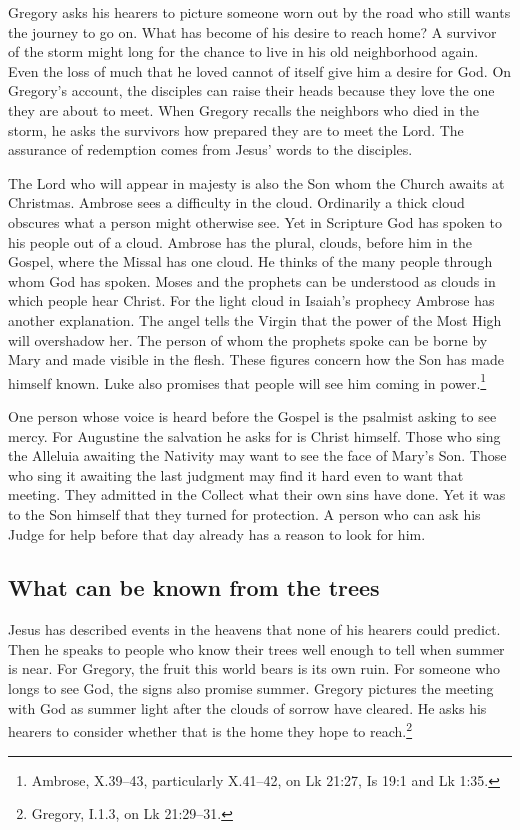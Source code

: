 Gregory asks his hearers to picture someone worn out by the road who still wants the journey to go on. What has become of his desire to reach home? A survivor of the storm might long for the chance to live in his old neighborhood again. Even the loss of much that he loved cannot of itself give him a desire for God. On Gregory's account, the disciples can raise their heads because they love the one they are about to meet. When Gregory recalls the neighbors who died in the storm, he asks the survivors how prepared they are to meet the Lord. The assurance of redemption comes from Jesus’ words to the disciples.

The Lord who will appear in majesty is also the Son whom the Church awaits at Christmas. Ambrose sees a difficulty in the cloud. Ordinarily a thick cloud obscures what a person might otherwise see. Yet in Scripture God has spoken to his people out of a cloud. Ambrose has the plural, clouds, before him in the Gospel, where the Missal has one cloud. He thinks of the many people through whom God has spoken. Moses and the prophets can be understood as clouds in which people hear Christ. For the light cloud in Isaiah's prophecy Ambrose has another explanation. The angel tells the Virgin that the power of the Most High will overshadow her. The person of whom the prophets spoke can be borne by Mary and made visible in the flesh. These figures concern how the Son has made himself known. Luke also promises that people will see him coming in power.\footnote{Ambrose,  X.39--43, particularly X.41--42, on Lk 21:27, Is 19:1 and Lk 1:35.}

One person whose voice is heard before the Gospel is the psalmist asking to see mercy. For Augustine the salvation he asks for is Christ himself. Those who sing the Alleluia awaiting the Nativity may want to see the face of Mary's Son. Those who sing it awaiting the last judgment may find it hard even to want that meeting. They admitted in the Collect what their own sins have done. Yet it was to the Son himself that they turned for protection. A person who can ask his Judge for help before that day already has a reason to look for him.

\subsection{What can be known from the trees}

Jesus has described events in the heavens that none of his hearers could predict. Then he speaks to people who know their trees well enough to tell when summer is near. For Gregory, the fruit this world bears is its own ruin. For someone who longs to see God, the signs also promise summer. Gregory pictures the meeting with God as summer light after the clouds of sorrow have cleared. He asks his hearers to consider whether that is the home they hope to reach.\footnote{Gregory,  I.1.3, on Lk 21:29--31.}

